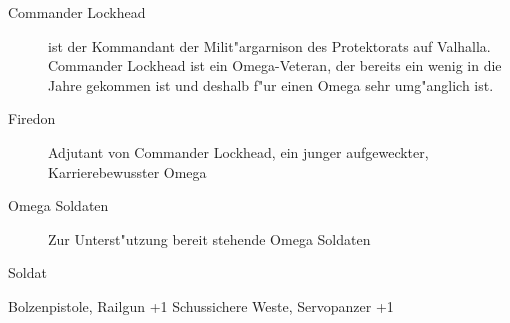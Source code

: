 
\begin{description}
    \item[Commander Lockhead] ist der Kommandant der Milit"argarnison des Protektorats auf Valhalla. Commander Lockhead ist ein 
        Omega-Veteran, der bereits ein wenig in die Jahre gekommen ist und deshalb f"ur einen Omega sehr umg"anglich ist. 
    \item[Firedon] Adjutant von Commander Lockhead, ein junger aufgeweckter, Karrierebewusster Omega
    \item[Omega Soldaten] Zur Unterst"utzung bereit stehende Omega Soldaten
\end{description}

\begin{nscsheet}{Soldat}
    \nscstats[ATT=3,AGG=2,CON=2]
    \nscruler
    \begin{nscinventory}
        \nscitem[Waffen] Bolzenpistole, Railgun +1
        \nscitem[R"ustung] Schussichere Weste, Servopanzer +1
    \end{nscinventory}
\end{nscsheet}
